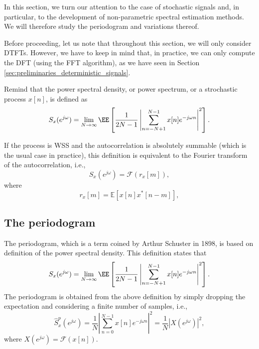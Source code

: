 In this section, we turn our attention to the case of stochastic signals and, in particular, to the development of non-parametric spectral estimation methods. We will therefore study the periodogram and variations thereof. 

Before proceeding, let us note that throughout this section, we will only consider DTFTs. However, we have to keep in mind that, in practice, we can only compute the DFT (using the FFT algorithm), as we have seen in Section \ref{sec:preliminaries_deterministic_signals}.

Remind that the power spectral density, or power spectrum, or a strochastic process $x[n]$, is defined as
\begin{equation*}
S_x(e^{j \omega})
	= \lim_{N \rightarrow \infty} \EE \left[\frac{1}{2N -1} \left| \sum_{n = -N+1}^{N-1} x[n] e^{-j \omega n} \right|^2 \right].
\end{equation*}

If the process is WSS and the autocorrelation is absolutely summable (which is the usual case in practice), this definition is equivalent to the Fourier transform of the autocorrelation, i.e.,
\begin{equation*}
S_x(e^{j \omega}) = \mathcal{F}(r_{x}[m]),
\end{equation*}
where
\begin{equation*}
r_{x}[m] = \mathbb{E}[x[n] x^{\ast}[n-m]],
\end{equation*}


\subsection{The periodogram}

The periodogram, which is a term coined by Arthur Schuster in 1898, is based on definition of the power spectral density. This definition states that
\begin{equation*}
S_x(e^{j \omega})
	= \lim_{N \rightarrow \infty} \EE \left[\frac{1}{2N -1} \left| \sum_{n = -N+1}^{N-1} x[n] e^{-j \omega n} \right|^2 \right].
\end{equation*}
The periodogram is obtained from the above definition by simply dropping the expectation and considering a finite number of samples, i.e.,
\begin{equation}
\label{eq:periodogram}
\hat{S}_x^{p}(e^{j \omega})
	= \frac1N \left| \sum_{n = 0}^{N-1} x[n] e^{-j \omega n} \right|^2 = \frac{1}{N} \left| X(e^{j \omega}) \right|^2,
\end{equation}
where $X(e^{j \omega})  = \mathcal{F}(x[n])$.







